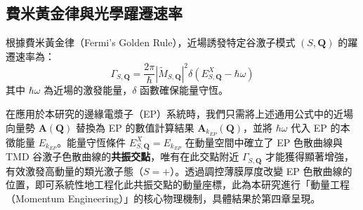 \subsection{費米黃金律與光學躍遷速率}

根據費米黃金律（Fermi's Golden Rule）\cite{Sakurai2020}，近場誘發特定谷激子模式 $(S, \mathbf{Q})$ 的躍遷速率為：
\begin{equation}
	\boxed{
		\Gamma_{S,\mathbf{Q}}
		= \frac{2\pi}{\hbar}
		\left|\tilde{M}_{S,\mathbf{Q}}\right|^2
		\delta\!\left(E^X_{S,\mathbf{Q}} - \hbar\omega\right)
	}
	\label{eq:fermi_golden_rule_nearfield}
\end{equation}
其中 $\hbar\omega$ 為近場的激發能量，$\delta$ 函數確保能量守恆。

在應用於本研究的邊緣電漿子（EP）系統時，我們只需將上述通用公式中的近場向量勢 $\mathbf{A}(\mathbf{Q})$ 替換為 EP 的數值計算結果 $\mathbf{A}_{k_{EP}}(\mathbf{Q})$，並將 $\hbar\omega$ 代入 EP 的本徵能量 $E_{k_{EP}}$。能量守恆條件 $E^X_{S,\mathbf{Q}} = E_{k_{EP}}$ 在動量空間中確立了 EP 色散曲線與 TMD 谷激子色散曲線的\textbf{共振交點}，唯有在此交點附近 $\Gamma_{S,\mathbf{Q}}$ 才能獲得顯著增強，有效激發高動量的類光激子態（$S = +$）。透過調控薄膜厚度改變 EP 色散曲線的位置，即可系統性地工程化此共振交點的動量座標，此為本研究進行「動量工程（Momentum Engineering）」的核心物理機制，具體結果於第四章呈現。


